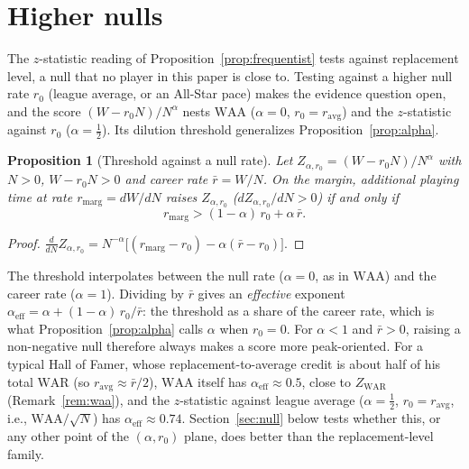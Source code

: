 \documentclass[11pt,letterpaper]{article}
\theoremstyle{plain}
\newtheorem{proposition}{Proposition}
\theoremstyle{definition}
\theoremstyle{remark}
\newcommand{\WAR}{\mathrm{WAR}}
\newcommand{\WAA}{\mathrm{WAA}}
\newcommand{\ZWAR}{Z_{\WAR}}
\begin{document}
\section{Higher nulls}
\label{app:null}

The $z$-statistic reading of Proposition~\ref{prop:frequentist} tests against replacement level, a null that no player in this paper is close to. Testing against a higher null rate $r_0$ (league average, or an All-Star pace) makes the evidence question open, and the score $(W - r_0 N)/N^{\alpha}$ nests $\WAA$ ($\alpha = 0$, $r_0 = r_{\mathrm{avg}}$) and the $z$-statistic against $r_0$ ($\alpha = \tfrac12$). Its dilution threshold generalizes Proposition~\ref{prop:alpha}.

\begin{proposition}[Threshold against a null rate]
\label{prop:null}
Let $Z_{\alpha, r_0} = (W - r_0 N)/N^{\alpha}$ with $N > 0$, $W - r_0 N > 0$ and career rate $\bar r = W/N$. On the margin, additional playing time at rate $r_{\mathrm{marg}} = dW/dN$ raises $Z_{\alpha, r_0}$ ($dZ_{\alpha, r_0}/dN > 0$) if and only if
\begin{equation}
    r_{\mathrm{marg}} > (1-\alpha)\,r_0 + \alpha\,\bar r .
\end{equation}
\end{proposition}

\begin{proof}
$\frac{d}{dN} Z_{\alpha, r_0} = N^{-\alpha}\bigl[(r_{\mathrm{marg}} - r_0) - \alpha (\bar r - r_0)\bigr]$.
\end{proof}

The threshold interpolates between the null rate ($\alpha = 0$, as in $\WAA$) and the career rate ($\alpha = 1$). Dividing by $\bar r$ gives an \emph{effective} exponent $\alpha_{\mathrm{eff}} = \alpha + (1-\alpha)\,r_0/\bar r$: the threshold as a share of the career rate, which is what Proposition~\ref{prop:alpha} calls $\alpha$ when $r_0 = 0$. For $\alpha < 1$ and $\bar r > 0$, raising a non-negative null therefore always makes a score more peak-oriented. For a typical Hall of Famer, whose replacement-to-average credit is about half of his total $\WAR$ (so $r_{\mathrm{avg}} \approx \bar r/2$), $\WAA$ itself has $\alpha_{\mathrm{eff}} \approx 0.5$, close to $\ZWAR$ (Remark~\ref{rem:waa}), and the $z$-statistic against league average ($\alpha = \tfrac12$, $r_0 = r_{\mathrm{avg}}$, i.e., $\WAA/\sqrt N$) has $\alpha_{\mathrm{eff}} \approx 0.74$. Section~\ref{sec:null} below tests whether this, or any other point of the $(\alpha, r_0)$ plane, does better than the replacement-level family.
\end{document}
